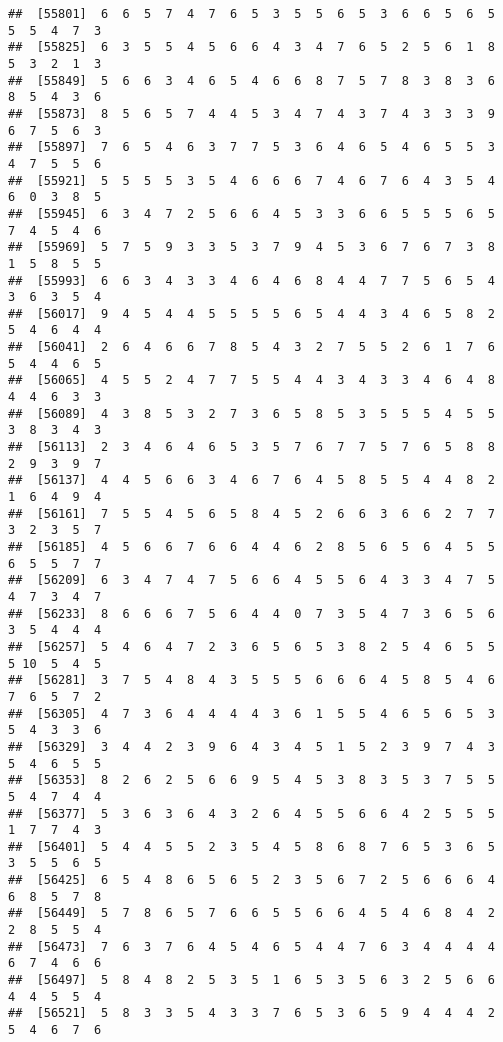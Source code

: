\documentclass[
]{book}
\begin{document}
\begin{verbatim}
##  [55801]  6  6  5  7  4  7  6  5  3  5  5  6  5  3  6  6  5  6  5  5  5  4  7  3
##  [55825]  6  3  5  5  4  5  6  6  4  3  4  7  6  5  2  5  6  1  8  5  3  2  1  3
##  [55849]  5  6  6  3  4  6  5  4  6  6  8  7  5  7  8  3  8  3  6  8  5  4  3  6
##  [55873]  8  5  6  5  7  4  4  5  3  4  7  4  3  7  4  3  3  3  9  6  7  5  6  3
##  [55897]  7  6  5  4  6  3  7  7  5  3  6  4  6  5  4  6  5  5  3  4  7  5  5  6
##  [55921]  5  5  5  5  3  5  4  6  6  6  7  4  6  7  6  4  3  5  4  6  0  3  8  5
##  [55945]  6  3  4  7  2  5  6  6  4  5  3  3  6  6  5  5  5  6  5  7  4  5  4  6
##  [55969]  5  7  5  9  3  3  5  3  7  9  4  5  3  6  7  6  7  3  8  1  5  8  5  5
##  [55993]  6  6  3  4  3  3  4  6  4  6  8  4  4  7  7  5  6  5  4  3  6  3  5  4
##  [56017]  9  4  5  4  4  5  5  5  5  6  5  4  4  3  4  6  5  8  2  5  4  6  4  4
##  [56041]  2  6  4  6  6  7  8  5  4  3  2  7  5  5  2  6  1  7  6  5  4  4  6  5
##  [56065]  4  5  5  2  4  7  7  5  5  4  4  3  4  3  3  4  6  4  8  4  4  6  3  3
##  [56089]  4  3  8  5  3  2  7  3  6  5  8  5  3  5  5  5  4  5  5  3  8  3  4  3
##  [56113]  2  3  4  6  4  6  5  3  5  7  6  7  7  5  7  6  5  8  8  2  9  3  9  7
##  [56137]  4  4  5  6  6  3  4  6  7  6  4  5  8  5  5  4  4  8  2  1  6  4  9  4
##  [56161]  7  5  5  4  5  6  5  8  4  5  2  6  6  3  6  6  2  7  7  3  2  3  5  7
##  [56185]  4  5  6  6  7  6  6  4  4  6  2  8  5  6  5  6  4  5  5  6  5  5  7  7
##  [56209]  6  3  4  7  4  7  5  6  6  4  5  5  6  4  3  3  4  7  5  4  7  3  4  7
##  [56233]  8  6  6  6  7  5  6  4  4  0  7  3  5  4  7  3  6  5  6  3  5  4  4  4
##  [56257]  5  4  6  4  7  2  3  6  5  6  5  3  8  2  5  4  6  5  5  5 10  5  4  5
##  [56281]  3  7  5  4  8  4  3  5  5  5  6  6  6  4  5  8  5  4  6  7  6  5  7  2
##  [56305]  4  7  3  6  4  4  4  4  3  6  1  5  5  4  6  5  6  5  3  5  4  3  3  6
##  [56329]  3  4  4  2  3  9  6  4  3  4  5  1  5  2  3  9  7  4  3  5  4  6  5  5
##  [56353]  8  2  6  2  5  6  6  9  5  4  5  3  8  3  5  3  7  5  5  5  4  7  4  4
##  [56377]  5  3  6  3  6  4  3  2  6  4  5  5  6  6  4  2  5  5  5  1  7  7  4  3
##  [56401]  5  4  4  5  5  2  3  5  4  5  8  6  8  7  6  5  3  6  5  3  5  5  6  5
##  [56425]  6  5  4  8  6  5  6  5  2  3  5  6  7  2  5  6  6  6  4  6  8  5  7  8
##  [56449]  5  7  8  6  5  7  6  6  5  5  6  6  4  5  4  6  8  4  2  2  8  5  5  4
##  [56473]  7  6  3  7  6  4  5  4  6  5  4  4  7  6  3  4  4  4  4  6  7  4  6  6
##  [56497]  5  8  4  8  2  5  3  5  1  6  5  3  5  6  3  2  5  6  6  4  4  5  5  4
##  [56521]  5  8  3  3  5  4  3  3  7  6  5  3  6  5  9  4  4  4  2  5  4  6  7  6

\end{verbatim}
\end{document}
